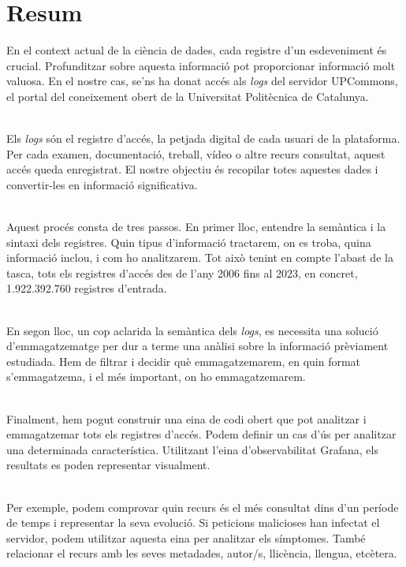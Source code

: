 \chapter*{Resum}\label{ch:abstract-ca}

En el context actual de la ciència de dades, cada registre d'un esdeveniment és crucial.
Profunditzar sobre aquesta informació pot proporcionar informació molt valuosa.
En el nostre cas, se'ns ha donat accés als \textit{logs} del servidor UPCommons, el portal del coneixement obert de la Universitat Politècnica de Catalunya.

\noindent \\
Els \textit{logs} són el registre d'accés, la petjada digital de cada usuari de la plataforma.
Per cada examen, documentació, treball, vídeo o altre recurs consultat, aquest accés queda enregistrat.
El nostre objectiu és recopilar totes aquestes dades i convertir-les en informació significativa.

\noindent \\
Aquest procés consta de tres passos.
En primer lloc, entendre la semàntica i la sintaxi dels registres.
Quin tipus d'informació tractarem, on es troba, quina informació inclou, i com ho analitzarem.
Tot això tenint en compte l'abast de la tasca, tots els registres d'accés des de l'any 2006 fins al 2023, en concret, 1.922.392.760 registres d'entrada.

\noindent \\
En segon lloc, un cop aclarida la semàntica dels \textit{logs}, es necessita una solució d'emmagatzematge per dur a terme una anàlisi sobre la informació prèviament estudiada.
Hem de filtrar i decidir què emmagatzemarem, en quin format s'emmagatzema, i el més important, on ho emmagatzemarem.

\noindent \\
Finalment, hem pogut construir una eina de codi obert que pot analitzar i emmagatzemar tots els registres d'accés.
Podem definir un cas d'ús per analitzar una determinada característica.
Utilitzant l'eina d'observabilitat Grafana, els resultats es poden representar visualment.

\noindent \\
Per exemple, podem comprovar quin recurs és el més consultat dins d'un període de temps i representar la seva evolució.
Si peticions malicioses han infectat el servidor, podem utilitzar aquesta eina per analitzar els símptomes.
També relacionar el recurs amb les seves metadades, autor/s, llicència, llengua, etcètera.

